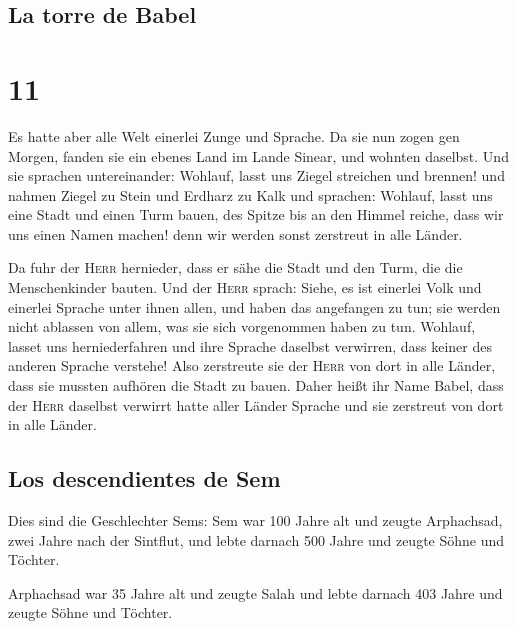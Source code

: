 \hypertarget{la-torre-de-babel}{%
\subsection{La torre de Babel}\label{la-torre-de-babel}}

\hypertarget{section-10}{%
\section{11}\label{section-10}}

 Es hatte aber alle Welt einerlei Zunge und Sprache.
 Da sie nun zogen gen Morgen, fanden sie ein ebenes Land
im Lande Sinear, und wohnten daselbst.  Und sie sprachen
untereinander: Wohlauf, lasst uns Ziegel streichen und brennen! und
nahmen Ziegel zu Stein und Erdharz zu Kalk  und sprachen:
Wohlauf, lasst uns eine Stadt und einen Turm bauen, des Spitze bis an
den Himmel reiche, dass wir uns einen Namen machen! denn wir werden
sonst zerstreut in alle Länder.

 Da fuhr der \textsc{Herr} hernieder, dass er sähe die
Stadt und den Turm, die die Menschenkinder bauten.  Und
der \textsc{Herr} sprach: Siehe, es ist einerlei Volk und einerlei
Sprache unter ihnen allen, und haben das angefangen zu tun; sie werden
nicht ablassen von allem, was sie sich vorgenommen haben zu tun.
 Wohlauf, lasset uns herniederfahren und ihre Sprache
daselbst verwirren, dass keiner des anderen Sprache verstehe!
 Also zerstreute sie der \textsc{Herr} von dort in alle
Länder, dass sie mussten aufhören die Stadt zu bauen. 
Daher heißt ihr Name Babel, dass der \textsc{Herr} daselbst verwirrt
hatte aller Länder Sprache und sie zerstreut von dort in alle Länder.

\hypertarget{los-descendientes-de-sem}{%
\subsection{Los descendientes de Sem}\label{los-descendientes-de-sem}}

 Dies sind die Geschlechter Sems: Sem war 100 Jahre alt
und zeugte Arphachsad, zwei Jahre nach der Sintflut,  und
lebte darnach 500 Jahre und zeugte Söhne und Töchter.

 Arphachsad war 35 Jahre alt und zeugte Salah
 und lebte darnach 403 Jahre und zeugte Söhne und
Töchter.

